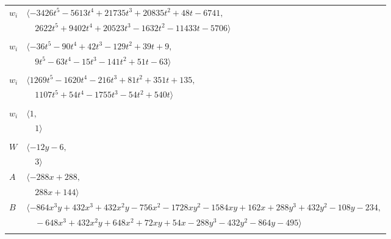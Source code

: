 \documentclass[11pt]{article}
\begin{document}
\begin{longtable}{@{}ll@{}}
$w_i$ & $\langle -3426t^{5}-5613t^{4}+21735t^{3}+20835t^{2}+48t-6741,$\\
 & $\quad 2622t^{5}+9402t^{4}+20523t^{3}-1632t^{2}-11433t-5706\rangle$\\
\addlinespace[2pt]
\multicolumn{2}{@{}p{0.97\textwidth}@{}}{$i=54$, $D_i=6$, $\rho_{ij}$: $3{:}1, \allowbreak 4{:}1, \allowbreak 7{:}1, \allowbreak 9{:}2, \allowbreak 12{:}2, \allowbreak 14{:}1, \allowbreak 29{:}2, \allowbreak 53{:}2, \allowbreak 55{:}1, \allowbreak 64{:}2, \allowbreak 67{:}1$}\\
$w_i$ & $\langle -36t^{5}-90t^{4}+42t^{3}-129t^{2}+39t+9,$\\
 & $\quad 9t^{5}-63t^{4}-15t^{3}-141t^{2}+51t-63\rangle$\\
\addlinespace[2pt]
\multicolumn{2}{@{}p{0.97\textwidth}@{}}{$i=55$, $D_i=108$, $\rho_{ij}$: $22{:}1, \allowbreak 24{:}2, \allowbreak 30{:}2, \allowbreak 46{:}2, \allowbreak 48{:}2, \allowbreak 53{:}2, \allowbreak 54{:}2, \allowbreak 58{:}1, \allowbreak 63{:}1, \allowbreak 64{:}2, \allowbreak 67{:}2$}\\
$w_i$ & $\langle 1269t^{5}-1620t^{4}-216t^{3}+81t^{2}+351t+135,$\\
 & $\quad 1107t^{5}+54t^{4}-1755t^{3}-54t^{2}+540t\rangle$\\
\addlinespace[2pt]
\multicolumn{2}{@{}p{0.97\textwidth}@{}}{$i=56$, $D_i=1$, $\rho_{ij}$: $41{:}1, \allowbreak 65{:}1, \allowbreak 71{:}1$}\\
$w_i$ & $\langle 1,$\\
 & $\quad 1\rangle$\\
\addlinespace[2pt]
\multicolumn{2}{@{}p{0.97\textwidth}@{}}{$i=57$, $D_i=6$, $\rho_{ij}$: $20{:}1, \allowbreak 49{:}2$}\\
$W$ & $\langle -12y-6,$\\
 & $\quad 3\rangle$\\
$A$ & $\langle -288x+288,$\\
 & $\quad 288x+144\rangle$\\
$B$ & $\langle -864x^{3}y+432x^{3}+432x^{2}y-756x^{2}-1728xy^{2}-1584xy+162x+288y^{3}+432y^{2}-108y-234,$\\
 & $\quad -648x^{3}+432x^{2}y+648x^{2}+72xy+54x-288y^{3}-432y^{2}-864y-495\rangle$\\
\addlinespace[2pt]
\multicolumn{2}{@{}p{0.97\textwidth}@{}}{$i=58$, $D_i=9$, $\rho_{ij}$: $0{:}1, \allowbreak 3{:}2, \allowbreak 8{:}1, \allowbreak 9{:}1, \allowbreak 12{:}1, \allowbreak 13{:}2, \allowbreak 40{:}2, \allowbreak 50{:}2, \allowbreak 52{:}2, \allowbreak 55{:}2, \allowbreak 60{:}2, \allowbreak 67{:}1, \allowbreak 74{:}1$}\\

\end{longtable}
\end{document}
